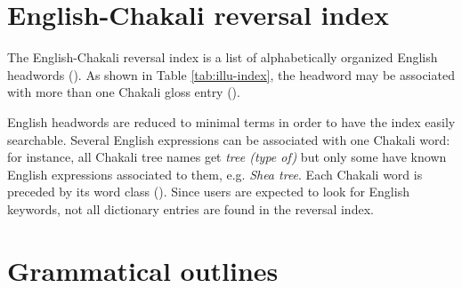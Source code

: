 \section{English-Chakali reversal index}
\label{sec:eng-cli-entry}

The English-Chakali reversal index is a list of  alphabetically organized 
English headwords (). As shown in Table 
\ref{tab:illu-index},  the headword may be 
associated with  more than one  Chakali 
gloss entry ().  



\begin{table}
\caption[]{Illustration of an English-Chakali reversal 
index entry\label{tab:illu-index}}
\begin{center} 
\end{center} 
\end{table}


English  headwords are reduced to minimal terms in order to have the index easily searchable. Several English expressions can be associated with one Chakali word: for instance, all Chakali tree names get {\it tree (type of)} but only some have known English expressions associated to  them, e.g. {\it Shea tree}. Each Chakali word is preceded by its word class ().  Since users are expected to  look for English keywords, not all dictionary entries are found in the reversal index.




\section{Grammatical outlines}
\label{sec:intro-outline}


